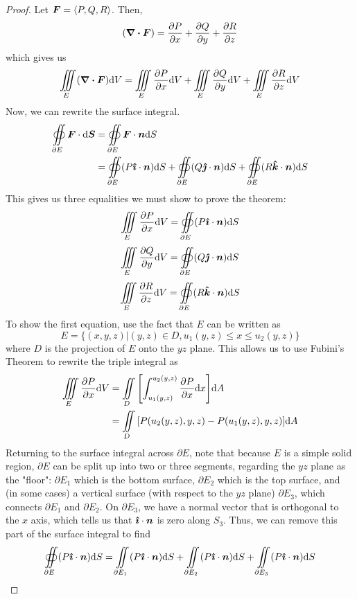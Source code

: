 \begin{proof}
    Let $\boldsymbol{F} = \left\langle P, Q, R\right\rangle$. Then,
    \[ (\div \boldsymbol{F}) = \pdv{P}{x} + \pdv{Q}{y} + \pdv{R}{z} \]
    which gives us
    \begin{align*}
        \iiint\limits_E (\div \boldsymbol{F})\dd V = \iiint\limits_E \pdv{P}{x}\dd V+\iiint\limits_E \pdv{Q}{y}\dd V+\iiint\limits_E \pdv{R}{z}\dd V
    \end{align*}
    Now, we can rewrite the surface integral.  
    \begin{align*}
        \oiint\limits_{\partial E}\boldsymbol{F} \cdot \dd \boldsymbol{S} &= \oiint\limits_{\partial E}\boldsymbol{F} \cdot \boldsymbol{n} \dd S \\
        &= \oiint\limits_{\partial E}(P\boldsymbol{\hat{\imath}} \cdot \boldsymbol{n})\dd S+\oiint\limits_{\partial E}(Q\boldsymbol{\hat{\jmath}} \cdot \boldsymbol{n})\dd S+\oiint\limits_{\partial E}(R\boldsymbol{\hat{k}} \cdot \boldsymbol{n})\dd S
    \end{align*} 
    This gives us three equalities we must show to prove the theorem:
    \[ \iiint\limits_E \pdv{P}{x}\dd V = \oiint\limits_{\partial E}(P\boldsymbol{\hat{\imath}} \cdot \boldsymbol{n})\dd S\]
    \[ \iiint\limits_E \pdv{Q}{y}\dd V = \oiint\limits_{\partial E}(Q\boldsymbol{\hat{\jmath}} \cdot \boldsymbol{n})\dd S\]
    \[ \iiint\limits_E \pdv{R}{z}\dd V = \oiint\limits_{\partial E}(R\boldsymbol{\hat{k}} \cdot \boldsymbol{n})\dd S\]
    To show the first equation, use the fact that $E$ can be written as
    \[ E = \{(x,y,z)|(y,z)\in D, u_1(y,z)\leq x\leq u_2(y,z) \} \]
    where $D$ is the projection of $E$ onto the $yz$ plane. This allows us to use Fubini's Theorem to rewrite the triple integral as
    \begin{align*}
        \iiint\limits_E \pdv{P}{x}\dd V &= \iint\limits_D \bqty{\int_{u_1(y,z)}^{u_2(y,z)}\pdv{P}{x}\dd x}\dd A \\
        &= \iint\limits_D \bqty{P(u_2(y,z), y, z) - P(u_1(y,z), y, z)}\dd A
    \end{align*}
    Returning to the surface integral across $\partial E$, note that because $E$ is a simple solid region, $\partial E$ can be split up into two or three segments, regarding the $yz$ plane as the "floor": $\partial E_1$ which is the bottom surface, $\partial E_2$ which is the top surface, and (in some cases) a vertical surface (with respect to the $yz$ plane)  $\partial E_3$, which connects $\partial E_1$ and $\partial E_2$. On $\partial E_3$, we have a normal vector that is orthogonal to the $x$ axis, which tells us that $\boldsymbol{\hat{\imath}} \cdot \boldsymbol{n}$ is zero along $S_3$. Thus, we can remove this part of the surface integral to find
    \begin{align*}
        \oiint\limits_{\partial E}(P\ihat \cdot \vec n)\dd S &= \iint\limits_{\partial E_1}(P\ihat \cdot \vec n)\dd S + \iint\limits_{\partial E_2}(P\ihat\cdot\vec n)\dd S +\iint\limits_{\partial E_3}(P\ihat\cdot\vec n)\dd S  \\

\end{align*}
\end{proof}
